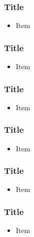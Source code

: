 \documentclass{beamer}\usepackage[]{graphicx}\usepackage[]{color}
\begin{document}
\begin{frame}
\frametitle{Title}
    \begin{itemize}
        \item Item
    \end{itemize}
\end{frame}

\begin{frame}
\frametitle{Title}
    \begin{itemize}
        \item Item
    \end{itemize}
\end{frame}

\begin{frame}
\frametitle{Title}
    \begin{itemize}
        \item Item
    \end{itemize}
\end{frame}

\begin{frame}
\frametitle{Title}
    \begin{itemize}
        \item Item
    \end{itemize}
\end{frame}

\begin{frame}
\frametitle{Title}
    \begin{itemize}
        \item Item
    \end{itemize}
\end{frame}

\begin{frame}
\frametitle{Title}
    \begin{itemize}
        \item Item
    \end{itemize}
\end{frame}
\end{document}
